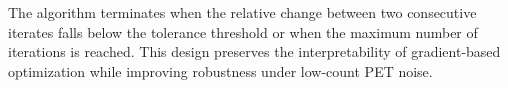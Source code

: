 The algorithm terminates when the relative change between two consecutive iterates falls below the tolerance threshold or when the maximum number of iterations is reached. This design preserves the interpretability of gradient-based optimization while improving robustness under low-count PET noise.
